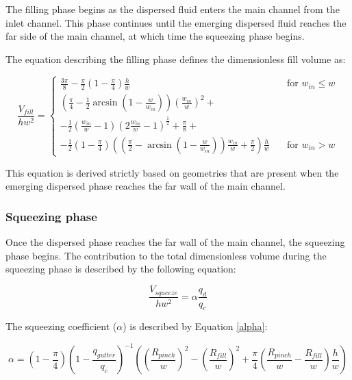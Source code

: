 The filling phase begins as the dispersed fluid enters the main
channel from the inlet channel. This phase continues until the emerging
dispersed fluid reaches the far side of the main channel, at which time
the squeezing phase begins.

The equation describing the filling phase defines the dimensionless fill volume as:

\begin{equation}
  \frac{V_{fill}}{hw^{2}} = 
    \begin{cases}
      \frac{3\pi}{8} - \frac{\pi}{2} \left(1 - \frac{\pi}{4}\right) \frac{h}{w} & \quad \text{for } w_{in} \leq w\\
      \left(\frac{\pi}{4} - \frac{1}{2} \arcsin\left(1-\frac{w}{w_{in}}\right)\right) \left(\frac{w_{in}}{w}\right)^2 + \\
      -\frac{1}{2} \left(\frac{w_{in}}{w} - 1\right) \left(2\frac{w_{in}}{w} - 1\right)^\frac{1}{2} +
      \frac{\pi}{8} + \\
      -\frac{1}{2} \left(1 - \frac{\pi}{4}\right) \left(\left(\frac{\pi}{2} - \arcsin\left(1 - \frac{w}{w_{in}}\right)\right)\frac{w_{in}}{w} + \frac{\pi}{2}\right)\frac{h}{w}
      & \quad \text{for } w_{in} > w
    \end{cases}\label{nondim_fill_vol}
  \end{equation}

This equation is derived strictly based on geometries that are present when the
emerging dispersed phase reaches the far wall of the main channel.

\subsubsection{Squeezing phase}

Once the dispersed phase reaches the far wall of the main channel, the squeezing
phase begins. The contribution to the total dimensionless volume during the
squeezing phase is described by the following equation:

\begin{equation}
  \frac{V_{squeeze}}{hw^2} = {\alpha}\frac{q_d}{q_c}\label{nondim_squeeze_vol}
\end{equation}

The squeezing coefficient ($\alpha$) is described by Equation \eqref{alpha}:

\begin{equation}
  \alpha = \left(1 - \frac{\pi}{4}\right)
  \left(1 - \frac{q_{gutter}}{q_{c}}\right)^{-1}
  \left(\left(\frac{R_{pinch}}{w}\right)^2 -
  \left(\frac{R_{fill}}{w}\right)^2 +
  \frac{\pi}{4}\left(\frac{R_{pinch}}{w} -
  \frac{R_{fill}}{w}\right)\frac{h}{w}\right)\label{alpha}
\end{equation}

